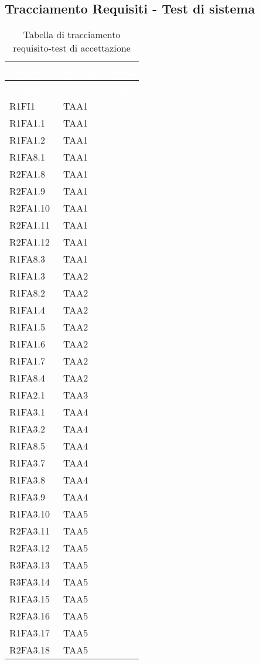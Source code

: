 \subsection{Tracciamento Requisiti - Test di sistema}
{
\renewcommand{\arraystretch}{1.5}
\centering
\begin{longtable}{C{4cm} C{4cm}}
\caption{Tabella di tracciamento requisito-test di accettazione}\\
\textcolor{white}{\textbf{Requisito}} & \textcolor{white}{\textbf{Test di sistema}}\\	
\endfirsthead
{}
\textcolor{white}{\textbf{Requisito}} & \textcolor{white}{\textbf{Test di sistema}}\\	
\endhead

R1FI1 & TAA1  \\
R1FA1.1 & TAA1  \\
R1FA1.2 & TAA1  \\
R1FA8.1 & TAA1  \\
R2FA1.8 & TAA1  \\
R2FA1.9 & TAA1  \\
R2FA1.10 & TAA1  \\
R2FA1.11 & TAA1  \\ 
R2FA1.12 & TAA1  \\ 
R1FA8.3 & TAA1  \\

R1FA1.3 & TAA2  \\
R1FA8.2 & TAA2  \\
R1FA1.4 & TAA2  \\
R1FA1.5 & TAA2  \\
R1FA1.6 & TAA2  \\
R1FA1.7 & TAA2  \\
R1FA8.4 & TAA2  \\

R1FA2.1 & TAA3  \\

R1FA3.1 & TAA4  \\
R1FA3.2 & TAA4  \\
R1FA8.5 & TAA4  \\
R1FA3.7 & TAA4  \\
R1FA3.8 & TAA4  \\
R1FA3.9 & TAA4  \\

R1FA3.10 & TAA5  \\
R2FA3.11 & TAA5  \\
R2FA3.12 & TAA5  \\
R3FA3.13 & TAA5  \\
R3FA3.14 & TAA5  \\
R1FA3.15 & TAA5  \\
R2FA3.16 & TAA5  \\
R1FA3.17 & TAA5  \\
R2FA3.18 & TAA5  \\


\end{longtable}}
